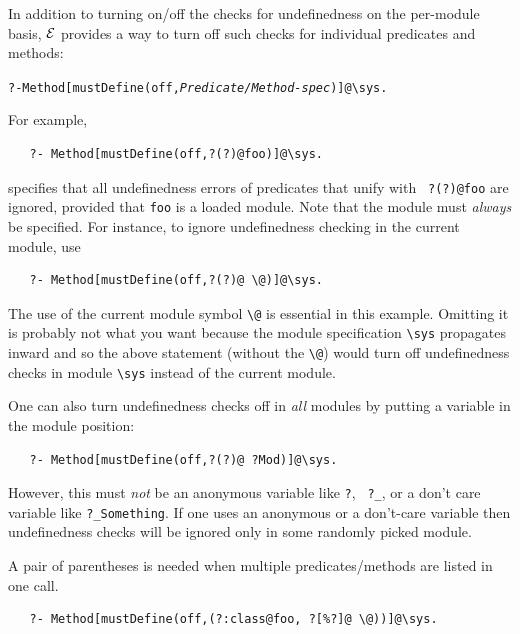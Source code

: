 \documentclass[11pt]{article}
\newcommand{\ERGO}{\mbox{\ensuremath{\cal{E}}\smaller{{\sc{RGO}}}}\xspace}
\newcommand{\FLSYSTEM}{\ERGO}
\newcommand{\bs}{\textbackslash}
\begin{document}
In addition to turning on/off the checks for undefinedness on the per-module
basis, \FLSYSTEM provides a way to turn off such checks for individual
predicates and methods:
\begin{alltt}
   ?- Method[mustDefine(off,\mbox{\rm\emph{Predicate/Method-spec}})]@\bs{}sys.
\end{alltt}
For example, 
\begin{verbatim}
   ?- Method[mustDefine(off,?(?)@foo)]@\sys.
\end{verbatim}
specifies that all undefinedness errors of predicates that unify with {\tt
  ?(?)@foo} are ignored, provided that {\tt foo} is a loaded module. Note
that the module must \emph{always} be specified. For instance, to ignore
undefinedness checking in the current module, use
\begin{verbatim}
   ?- Method[mustDefine(off,?(?)@ \@)]@\sys.
\end{verbatim}
The use of the current module symbol {\tt \bs{}@} is essential in
this example. Omitting it is probably not what you want because
the module specification {\tt \bs{}sys} propagates inward and so the above
statement (without the {\tt \bs{}@}) would turn off undefinedness checks in
module {\tt \bs{}sys} instead of the current module.

One can also turn undefinedness checks off in \emph{all} modules by putting a
variable in the module position:
\begin{verbatim}
   ?- Method[mustDefine(off,?(?)@ ?Mod)]@\sys.
\end{verbatim}
However, this must \emph{not} be an anonymous variable like {\tt ?}, {\tt
  ?\_}, or a don't care variable like {\tt ?\_Something}.  If one uses an
anonymous or a don't-care variable then undefinedness checks will be ignored
only in some randomly picked module.

A pair of parentheses is needed when multiple
predicates/methods are listed in one call.
\begin{verbatim}
   ?- Method[mustDefine(off,(?:class@foo, ?[%?]@ \@))]@\sys.
\end{verbatim}
\end{document}
